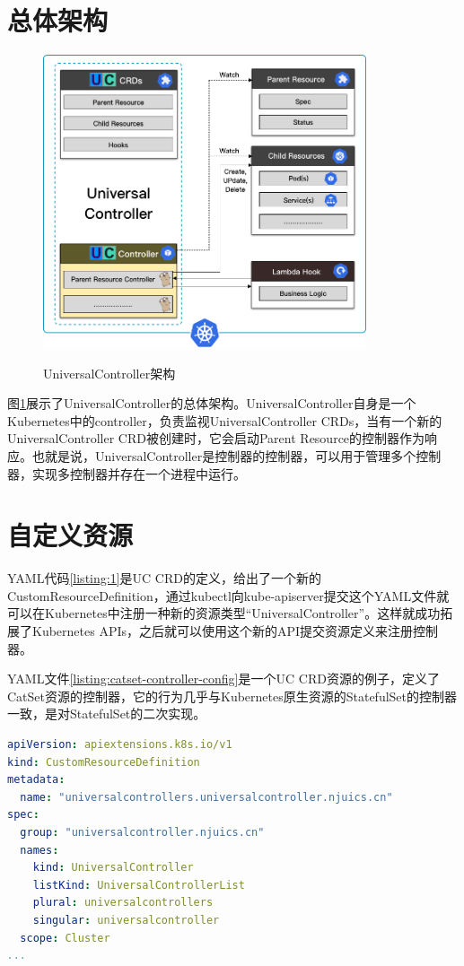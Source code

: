 \documentclass[macfonts,master]{njuthesis}
\begin{document}
\section{总体架构}

\begin{figure}[htbp]
  \centering
  \includegraphics[width= 0.85\textwidth]{pics/uc-arch.png}\\
  \caption{UniversalController架构}\label{fig:uc-arch}
\end{figure}

图\ref{fig:uc-arch}展示了UniversalController的总体架构。UniversalController自身是一个Kubernetes中的controller，负责监视UniversalController CRDs，当有一个新的UniversalController CRD被创建时，它会启动Parent Resource的控制器作为响应。也就是说，UniversalController是控制器的控制器，可以用于管理多个控制器，实现多控制器并存在一个进程中运行。


\section{自定义资源}
YAML代码\ref{listing:1}是UC CRD的定义，给出了一个新的CustomResourceDefinition，通过kubectl向kube-apiserver提交这个YAML文件就可以在Kubernetes中注册一种新的资源类型``UniversalController''。这样就成功拓展了Kubernetes APIs，之后就可以使用这个新的API提交资源定义来注册控制器。

YAML文件\ref{listing:catset-controller-config}是一个UC CRD资源的例子，定义了CatSet资源的控制器，它的行为几乎与Kubernetes原生资源的StatefulSet的控制器一致，是对StatefulSet的二次实现。

\newpage
\begin{lstlisting}[language=yaml,caption=UC CRD,label=listing:1]
apiVersion: apiextensions.k8s.io/v1
kind: CustomResourceDefinition
metadata:
  name: "universalcontrollers.universalcontroller.njuics.cn"
spec:
  group: "universalcontroller.njuics.cn"
  names:
    kind: UniversalController
    listKind: UniversalControllerList
    plural: universalcontrollers
    singular: universalcontroller
  scope: Cluster
...
\end{lstlisting}
\end{document}
